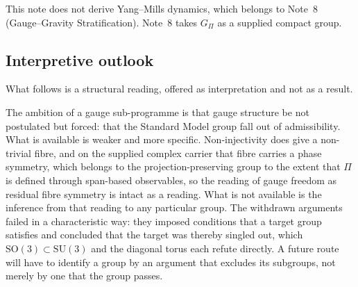 \documentclass[11pt,a4paper]{article}
\theoremstyle{definition}
\newcommand{\SU}{\mathrm{SU}}
\newcommand{\SO}{\mathrm{SO}}
\newcommand{\Gpi}{G_{\Pi}}
\begin{document}
    This note does not derive Yang--Mills dynamics, which belongs to Note~8
    (Gauge--Gravity Stratification).
    Note~8 takes $\Gpi$ as a supplied compact group.

    \subsection*{Interpretive outlook}

    What follows is a structural reading, offered as interpretation and not as a result.

    The ambition of a gauge sub-programme is that gauge structure be not postulated but forced:
    that the Standard Model group fall out of admissibility.
    What is available is weaker and more specific.
    Non-injectivity does give a non-trivial fibre, and on the supplied complex carrier that fibre
    carries a phase symmetry, which belongs to the projection-preserving group to the extent that
    $\Pi$ is defined through span-based observables, so the reading of gauge freedom as residual
    fibre symmetry is intact as a reading.
    What is not available is the inference from that reading to any particular group.
    The withdrawn arguments failed in a characteristic way: they imposed conditions that a target
    group satisfies and concluded that the target was thereby singled out, which
    $\SO(3) \subset \SU(3)$ and the diagonal torus each refute directly.
    A future route will have to identify a group by an argument that excludes its subgroups, not
    merely by one that the group passes.

    \newpage
    
    
\end{document}
